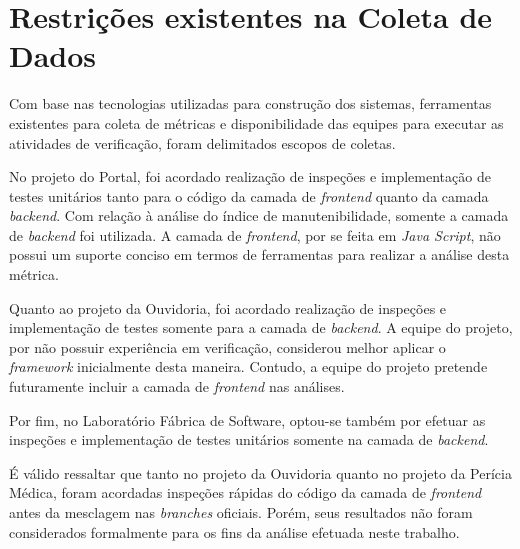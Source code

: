\section{Restrições existentes na Coleta de Dados}

Com base nas tecnologias utilizadas para construção dos sistemas, ferramentas existentes para coleta de métricas e disponibilidade das equipes para executar as atividades de verificação, foram delimitados escopos de coletas.

No projeto do Portal, foi acordado realização de inspeções e implementação de testes unitários tanto para o código da camada de \textit{frontend} quanto da camada \textit{backend}. Com relação à análise do índice de manutenibilidade, somente a camada de \textit{backend} foi utilizada. A camada de \textit{frontend}, por se feita em \textit{Java Script}, não possui um suporte conciso em termos de ferramentas para realizar a análise desta métrica.

Quanto ao projeto da Ouvidoria, foi acordado realização de inspeções e implementação de testes somente para a camada de \textit{backend}. A equipe do projeto, por não possuir experiência em verificação, considerou melhor aplicar o \textit{framework} inicialmente desta maneira. Contudo, a equipe do projeto pretende futuramente incluir a camada de \textit{frontend} nas análises.

Por fim, no Laboratório Fábrica de Software, optou-se também por efetuar as inspeções e implementação de testes unitários somente na camada de \textit{backend}.

É válido ressaltar que tanto no projeto da Ouvidoria quanto no projeto da Perícia Médica, foram acordadas inspeções rápidas do código da camada de \textit{frontend} antes da mesclagem nas \textit{branches} oficiais. Porém, seus resultados não foram considerados formalmente para os fins da análise efetuada neste trabalho.